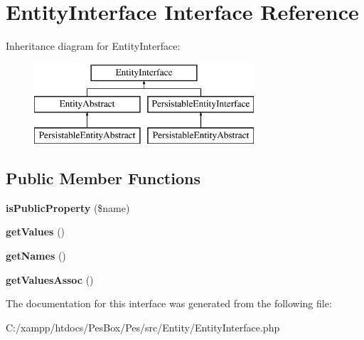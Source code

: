 \hypertarget{interface_pes_1_1_entity_1_1_entity_interface}{}\section{Entity\+Interface Interface Reference}
\label{interface_pes_1_1_entity_1_1_entity_interface}
Inheritance diagram for Entity\+Interface\+:\begin{figure}[H]
\begin{center}
\leavevmode
\includegraphics[height=3.000000cm]{interface_pes_1_1_entity_1_1_entity_interface}
\end{center}
\end{figure}
\subsection*{Public Member Functions}
\begin{DoxyCompactItemize}
\item 
\mbox{\label{interface_pes_1_1_entity_1_1_entity_interface_aa232b7b1d48256769082d3351dfd5001}} 
{\bfseries is\+Public\+Property} (\$name)
\item 
\mbox{\label{interface_pes_1_1_entity_1_1_entity_interface_a70a0fe08035189260c72e32a9e20d30c}} 
{\bfseries get\+Values} ()
\item 
\mbox{\label{interface_pes_1_1_entity_1_1_entity_interface_a64e8191090bf560e825966b082e868f0}} 
{\bfseries get\+Names} ()
\item 
\mbox{\label{interface_pes_1_1_entity_1_1_entity_interface_a8b5c943485575ffd0388c24998990e22}} 
{\bfseries get\+Values\+Assoc} ()
\end{DoxyCompactItemize}


The documentation for this interface was generated from the following file\+:\begin{DoxyCompactItemize}
\item 
C\+:/xampp/htdocs/\+Pes\+Box/\+Pes/src/\+Entity/Entity\+Interface.\+php\end{DoxyCompactItemize}
